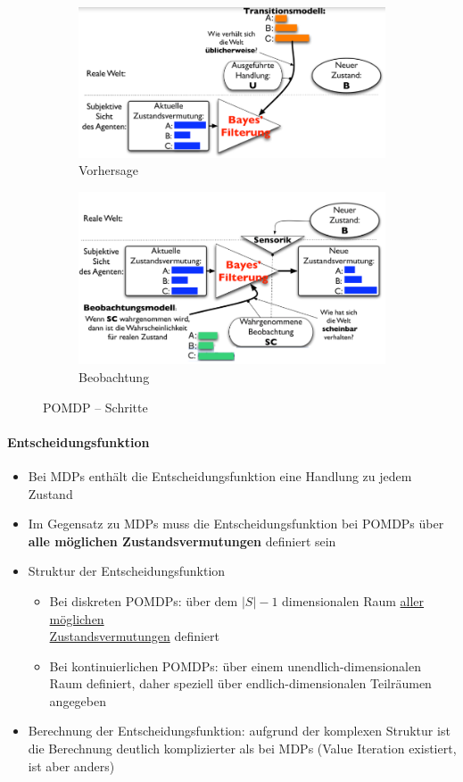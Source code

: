 \begin{figure}[!ht]
\begin{subfigure}{.45\textwidth}
		\includegraphics[width=\textwidth]{figures/ch08_pom3.png}
		\caption{Vorhersage}
	\end{subfigure}
	\begin{subfigure}{.45\textwidth}
		\includegraphics[width=\textwidth]{figures/ch08_pom4.png}
		\caption{Beobachtung}
	\end{subfigure}
	\caption{POMDP -- Schritte}
	\label{pom}
\end{figure}

\paragraph{Entscheidungsfunktion}
\begin{itemize}
	\item Bei MDPs enth\"alt die Entscheidungsfunktion eine Handlung zu jedem Zustand
	\item Im Gegensatz zu MDPs muss die Entscheidungsfunktion bei POMDPs \"uber \textbf{alle m\"oglichen Zustandsvermutungen} definiert sein
	\item Struktur der Entscheidungsfunktion
	\begin{itemize}
		\item Bei diskreten POMDPs: \"uber dem $|S|-1$ dimensionalen Raum \underline{aller m\"oglichen}\\ \underline{Zustandsvermutungen} definiert
		\item Bei kontinuierlichen POMDPs: \"uber einem unendlich-dimensionalen Raum definiert, daher speziell \"uber endlich-dimensionalen Teilr\"aumen angegeben
	\end{itemize}
	\item Berechnung der Entscheidungsfunktion: aufgrund der komplexen Struktur ist die Berechnung deutlich komplizierter als bei MDPs (Value Iteration existiert, ist aber anders)
\end{itemize}

